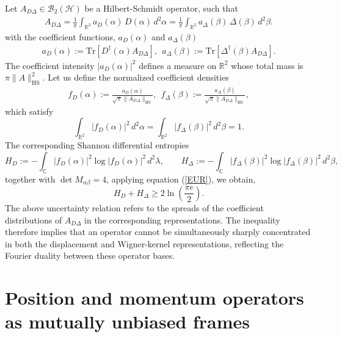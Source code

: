 \documentclass[aps,pra,onecolumn,nofootinbib,superscriptaddress,showpacs]{revtex4}
\begin{document}
\noindent Let $A_{D\Delta}\in\mathcal{B}_2(\mathcal{H})$ be a Hilbert-Schmidt operator, such that 
\begin{align}
A_{D\Delta} = \frac{1}{\pi} \int_{\mathbb R^2} a_D(\alpha)\, D(\alpha)\, d^2\alpha 
= \frac{1}{\pi} \int_{\mathbb R^2} a_\Delta(\beta)\, \Delta(\beta)\, d^2\beta.
\end{align}
with the coefficient functions, $a_D(\alpha)$ and $a_\Delta(\beta)$
\begin{align}\label{coef}
a_D(\alpha) := \mathrm{Tr}\!\left[D^\dagger(\alpha)A_{D\Delta}\right],~~
a_\Delta(\beta) := \mathrm{Tr}\!\left[\Delta^\dagger(\beta)A_{D\Delta}\right].
\end{align}
The coefficient intensity $|a_D(\alpha)|^2$ defines a measure on $\mathbb R^2$ whose total mass is $\pi \|A\|_{\mathrm{HS}}^2$.
Let us define the normalized coefficient densities
\begin{align}
f_D(\alpha) := \frac{a_D(\alpha)}{\sqrt{\pi}\|A_{D\Delta}\|_{\mathrm{HS}}},~~f_\Delta(\beta) := \frac{a_\Delta(\beta)}{\sqrt{\pi}\|A_{D\Delta}\|_{\mathrm{HS}}},
\end{align}
which satisfy
\begin{equation}
\int_{\mathbb R^2} |f_D(\alpha)|^2\,d^2\alpha
=
\int_{\mathbb R^2} |f_\Delta(\beta)|^2\,d^2\beta
=
1.
\end{equation}
The corresponding Shannon differential entropies
\[
H_D:=-\int_{\mathbb C}|f_D(\alpha)|^2\log |f_D(\alpha)|^2\,d^2\lambda,
\qquad
H_\Delta:=-\int_{\mathbb C}|f_\Delta(\beta)|^2\log |f_\Delta(\beta)|^2\,d^2\beta,
\]
together with $\det M_{\alpha\beta}=4$, applying equation (\ref{EUR}), we obtain,
\[
H_D+H_\Delta \ge 2\ln\!\left(\frac{\pi e}{2}\right).
\]
The above uncertainty relation refers to the spreads of the coefficient distributions of $A_{D\Delta}$ in the corresponding representations. The inequality therefore implies that an operator cannot be simultaneously sharply concentrated in both the displacement and Wigner-kernel representations, reflecting the Fourier duality between these operator bases.



\section{Position and momentum operators as mutually unbiased frames}
\end{document}
